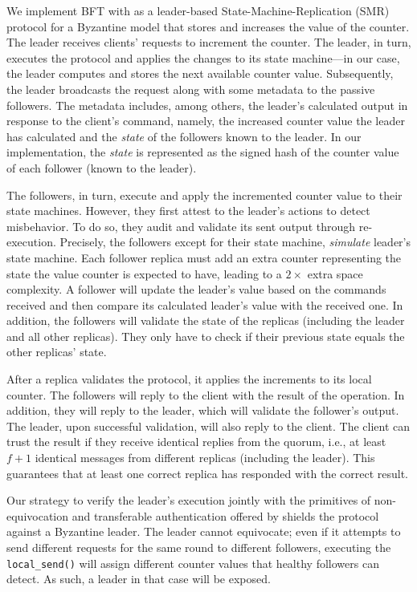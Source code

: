  We implement BFT with \projecttitle{} as a leader-based State-Machine-Replication (SMR) protocol for a Byzantine model that stores and increases the value of the counter. The leader receives clients' requests to increment the counter. The leader, in turn, executes the protocol and applies the changes to its state machine---in our case, the leader computes and stores the next available counter value. Subsequently, the leader broadcasts the request along with some metadata to the passive followers. The metadata includes, among others, the leader's calculated output in response to the client's command, namely, the increased counter value the leader has calculated and the {\em state} of the followers known to the leader. In our implementation, the {\em state} is represented as the signed hash of the counter value of each follower (known to the leader).

The followers, in turn, execute and apply the incremented counter value to their state machines. However, they first attest to the leader's actions to detect misbehavior. To do so, they audit and validate its sent output through re-execution. Precisely, the followers except for their state machine, {\em simulate} leader's state machine. Each follower replica must add an extra counter representing the state the value counter is expected to have, leading to a $2\times$ extra space complexity. A follower will update the leader's value based on the commands received and then compare its calculated leader's value with the received one. In addition, the followers will validate the state of the replicas (including the leader and all other replicas). They only have to check if their previous state equals the other replicas' state.

After a replica validates the protocol, it applies the increments to its local counter. The followers will reply to the client with the result of the operation. In addition, they will reply to the leader, which will validate the follower's output. The leader, upon successful validation, will also reply to the client. The client can trust the result if they receive identical replies from the quorum, i.e., at least $f+1$ identical messages from different replicas (including the leader). This guarantees that at least one correct replica has responded with the correct result.


 Our strategy to verify the leader's execution jointly with the primitives of non-equivocation and transferable authentication offered by \projecttitle{} shields the protocol against a Byzantine leader. The leader cannot equivocate; even if it attempts to send different requests for the same round to different followers, executing the {\tt local\_send()} will assign different counter values that healthy followers can detect. As such, a leader in that case will be exposed. 

